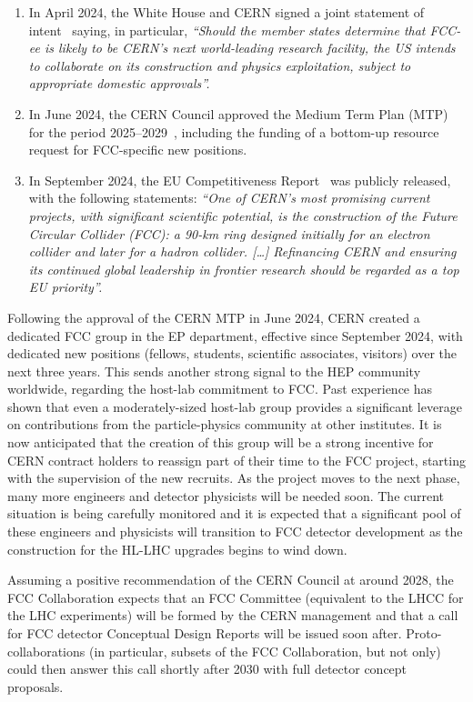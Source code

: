 \begin{enumerate}
\item In April 2024, the White House and CERN signed a joint statement of intent~\cite{WHCERN} saying, in particular, \emph{``Should the member states determine that FCC-ee is likely to be CERN’s next world-leading research facility, the US intends to collaborate on its construction and physics exploitation, subject to appropriate domestic approvals''.}
\item In June 2024, the CERN Council approved the Medium Term Plan (MTP) for the period 2025--2029~\cite{CERNmtp2}, including the funding of a bottom-up resource request for FCC-specific new positions.
\item In September 2024, the EU Competitiveness Report~\cite{EUCompetitivenessReport} was publicly released, with the following statements: 
\emph{``One of CERN’s most promising current projects, with significant scientific potential, is the construction of the Future Circular Collider (FCC): a 90-km ring designed initially for an electron collider and later for a hadron collider. [\ldots] 
Refinancing CERN and ensuring its continued global leadership in frontier research should be regarded as a top EU priority''.}
\end{enumerate}

Following the approval of the CERN MTP in June 2024, CERN created a dedicated FCC group in the EP department, effective since September 2024, with dedicated new positions (fellows, students, scientific associates, visitors) over the next three years. 
This sends another strong signal to the HEP community worldwide, regarding the host-lab commitment to FCC. 
Past experience has shown that even a moderately-sized host-lab group provides a significant leverage on contributions from the particle-physics community at other institutes. 
It is now anticipated that the creation of this group will be a strong incentive for CERN contract holders to reassign part of their time to the FCC project, starting with the supervision of the new recruits.
As the project moves to the next phase, many more engineers and detector physicists will be needed soon. 
The current situation is being carefully monitored and it is expected that a significant pool of these engineers and physicists will transition to FCC detector development as the  construction for the HL-LHC upgrades begins to wind down.

Assuming a positive recommendation of the CERN Council at around 2028, the FCC Collaboration expects that an FCC Committee (equivalent to the LHCC for the LHC experiments) will be formed by the CERN management and that a call for FCC detector Conceptual Design Reports will be issued soon after. 
Proto-collaborations (in particular, subsets of the FCC Collaboration, but not only) could then answer this call shortly after 2030 with full detector concept proposals. 

